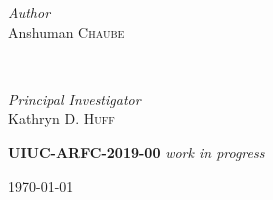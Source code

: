 \documentclass[14pt,a4paper]{article} %
\begin{document}
\begin{titlepage}
\begin{minipage}{0.6\textwidth}
        \end{minipage}

    \vspace{0.2cm}
    \HRule
    \vspace{0.5cm}
    
    
    \begin{minipage}{0.4\textwidth}
        \begin{flushleft}
            \large
            \textit{Author}\\
            Anshuman \textsc{Chaube}\\
        \end{flushleft}
    \end{minipage}
    ~
    \begin{minipage}{0.4\textwidth}
        \begin{flushright}
            \large
            \textit{Principal Investigator}\\
            Kathryn D. \textsc{Huff} %
        \end{flushright}
    \end{minipage}
    

    \vspace{1cm}
    \textsc{\LARGE\bfseries UIUC-ARFC-2019-00} \textit{work in progress} %
    \vspace{0.5cm}
    
    
    \vspace{0.5cm} %
    {\large\today} %
    \vspace{0.5cm}

    

\end{titlepage}
\end{document}
